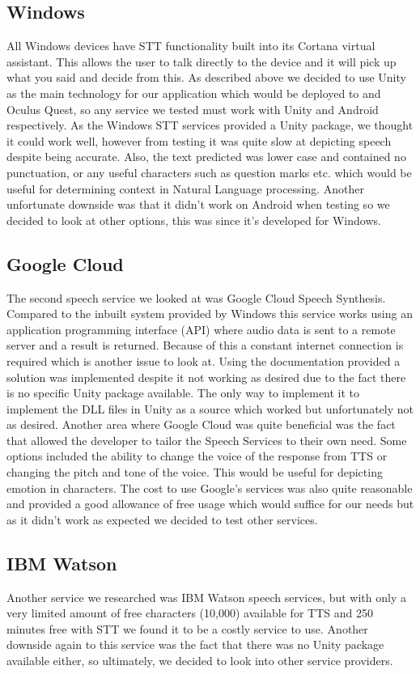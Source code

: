\subsection{Windows}
All Windows devices have STT functionality built into its Cortana virtual assistant. This allows the user to talk directly to the device and it will pick up what you said and decide from this. As described above we decided to use Unity as the main technology for our application which would be deployed to and Oculus Quest, so any service we tested must work with Unity and Android respectively. As the Windows STT services provided a Unity package, we thought it could work well, however from testing it was quite slow at depicting speech despite being accurate. Also, the text predicted was lower case and contained no punctuation, or any useful characters such as question marks etc. which would be useful for determining context in Natural Language processing. Another unfortunate downside was that it didn't work on Android when testing so we decided to look at other options, this was since it's developed for Windows. 

\subsection{Google Cloud}
The second speech service we looked at was Google Cloud Speech Synthesis. Compared to the inbuilt system provided by Windows this service works using an application programming interface (API) where audio data is sent to a remote server and a result is returned. Because of this a constant internet connection is required which is another issue to look at. Using the documentation provided a solution was implemented despite it not working as desired due to the fact there is no specific Unity package available. The only way to implement it to implement the DLL files in Unity as a source which worked but unfortunately not as desired. Another area where Google Cloud was quite beneficial was the fact that allowed the developer to tailor the Speech Services to their own need. Some options included the ability to change the voice of the response from TTS or changing the pitch and tone of the voice. This would be useful for depicting emotion in characters. The cost to use Google's services was also quite reasonable and provided a good allowance of free usage which would suffice for our needs but as it didn't work as expected we decided to test other services. 

\subsection{IBM Watson}
Another service we researched was IBM Watson speech services, but with only a very limited amount of free characters (10,000) available for TTS and 250 minutes free with STT we found it to be a costly service to use. Another downside again to this service was the fact that there was no Unity package available either, so ultimately, we decided to look into other service providers.

